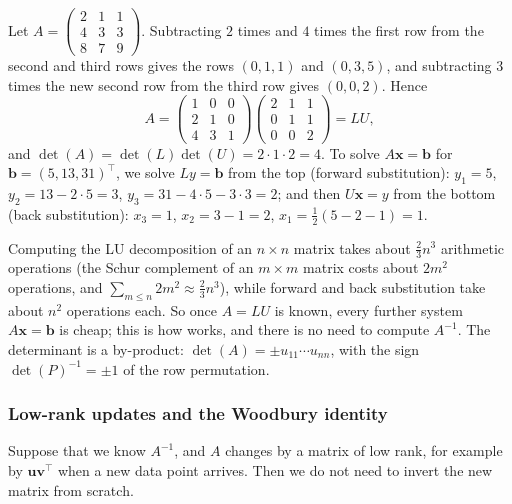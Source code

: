 \begin{example}\label{L1-ex:lu}
    Let $A = \begin{pmatrix} 2 & 1 & 1 \\ 4 & 3 & 3 \\ 8 & 7 & 9 \end{pmatrix}$. Subtracting $2$ times and $4$ times the first row from the second and third rows gives the rows $(0, 1, 1)$ and $(0, 3, 5)$, and subtracting $3$ times the new second row from the third row gives $(0, 0, 2)$. Hence
    \[A = \begin{pmatrix} 1 & 0 & 0 \\ 2 & 1 & 0 \\ 4 & 3 & 1 \end{pmatrix}\begin{pmatrix} 2 & 1 & 1 \\ 0 & 1 & 1 \\ 0 & 0 & 2 \end{pmatrix} = LU,\]
    and $\det(A) = \det(L)\det(U) = 2 \cdot 1 \cdot 2 = 4$. To solve $A\mathbf{x} = \mathbf{b}$ for $\mathbf{b} = (5, 13, 31)^\top$, we solve $Ly = \mathbf{b}$ from the top (forward substitution): $y_1 = 5$, $y_2 = 13 - 2 \cdot 5 = 3$, $y_3 = 31 - 4 \cdot 5 - 3 \cdot 3 = 2$; and then $U\mathbf{x} = y$ from the bottom (back substitution): $x_3 = 1$, $x_2 = 3 - 1 = 2$, $x_1 = \frac{1}{2}(5 - 2 - 1) = 1$.
\end{example}

Computing the LU decomposition of an $n \times n$ matrix takes about $\frac{2}{3}n^3$ arithmetic operations (the Schur complement of an $m \times m$ matrix costs about $2m^2$ operations, and $\sum_{m \leq n} 2m^2 \approx \frac{2}{3}n^3$), while forward and back substitution take about $n^2$ operations each. So once $A = LU$ is known, every further system $A\mathbf{x} = \mathbf{b}$ is cheap; this is how  works, and there is no need to compute $A^{-1}$. The determinant is a by-product: $\det(A) = \pm u_{11} \cdots u_{nn}$, with the sign $\det(P)^{-1} = \pm 1$ of the row permutation.

\subsubsection{Low-rank updates and the Woodbury identity}

Suppose that we know $A^{-1}$, and $A$ changes by a matrix of low rank, for example by $\mathbf{u}\mathbf{v}^\top$ when a new data point arrives. Then we do not need to invert the new matrix from scratch.

